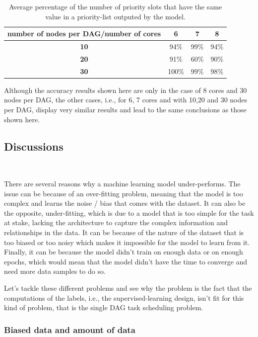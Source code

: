 \begin{table}
    \begin{tabular}{|c|c|c|c|}
        \hline
        \textbf{number of nodes per DAG/number of cores} & \textbf{6} & \textbf{7} & \textbf{8}\\
        \hline
        \textbf{10} & 94\% & 99\% & 94\%\\
        \hline
        \textbf{20} & 91\% & 60\% & 90\%\\
        \hline
        \textbf{30} & 100\% & 99\% & 98\%\\
        \hline
    \end{tabular}
    \caption{Average percentage of the number of priority slots that have the same value
    in a priority-list outputed by the model.}
    \label{tab:similarity_percentages}
\end{table}


Although the accuracy results shown here are only 
in the case of 8 cores and 30 nodes per DAG,
the other cases, i.e., for 6, 7 cores and with 10,20 and 30 nodes per DAG,
display very similar results and lead to the same conclusions as those
shown here.

\subsection{Discussions}
~
\label{sec:discussion}

There are several reasons why a machine learning model
under-performs.
The issue can be because of an over-fitting problem,
meaning that the model is too complex and learns the noise / bias
that comes with the dataset.
It can also be the opposite, under-fitting, 
which is due to a model that is too simple for the task at stake,
lacking the architecture to capture the complex information and 
relationships
in the data.
It can be because of the nature of the dataset that is too biased
or too noisy which makes it impossible for the model to learn from it.
Finally, it can be because the model didn't train on enough data 
or on enough epochs, which would mean that the model didn't have
the time to converge and need more data samples to do so.

Let's tackle these different problems and see why 
the problem is the fact that 
the computations of the labels, i.e., the supervised-learning design, isn't fit for this kind of problem,
that is the single DAG task scheduling problem.


\subsubsection{Biased data and amount of data}
~

